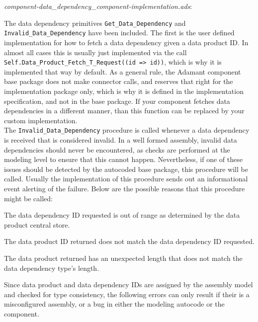 \textit{component-data\_dependency\_component-implementation.ads}:

The data dependency primitives \texttt{Get\_Data\_Dependency} and \texttt{Invalid\_Data\_Dependency} have been included. The first is the user defined implementation for how to fetch a data dependency given a data product ID. In almost all cases this is usually just implemented via the call \texttt{Self.Data\_Product\_Fetch\_T\_Request((id => id))}, which is why it is implemented that way by default. As a general rule, the Adamant component base package does not make connector calls, and reserves that right for the implementation package only, which is why it is defined in the implementation specification, and not in the base package. If your component fetches data dependencies in a different manner, than this function can be replaced by your custom implementation. \\

The \texttt{Invalid\_Data\_Dependency} procedure is called whenever a data dependency is received that is considered invalid. In a well formed assembly, invalid data dependencies should never be encountered, as checks are performed at the modeling level to ensure that this cannot happen. Nevertheless, if one of these issues should be detected by the autocoded base package, this procedure will be called. Usually the implementation of this procedure sends out an informational event alerting of the failure. Below are the possible reasons that this procedure might be called:

\vspace{5mm} %
\begin{spaceditemize}
  \item The data dependency ID requested is out of range as determined by the data product central store.
  \item The data product ID returned does not match the data dependency ID requested.
  \item The data product returned has an unexpected length that does not match the data dependency type's length.
\end{spaceditemize}
\vspace{5mm} %

Since data product and data dependency IDs are assigned by the assembly model and checked for type consistency, the following errors can only result if their is a misconfigured assembly, or a bug in either the modeling autocode or the component. \\

